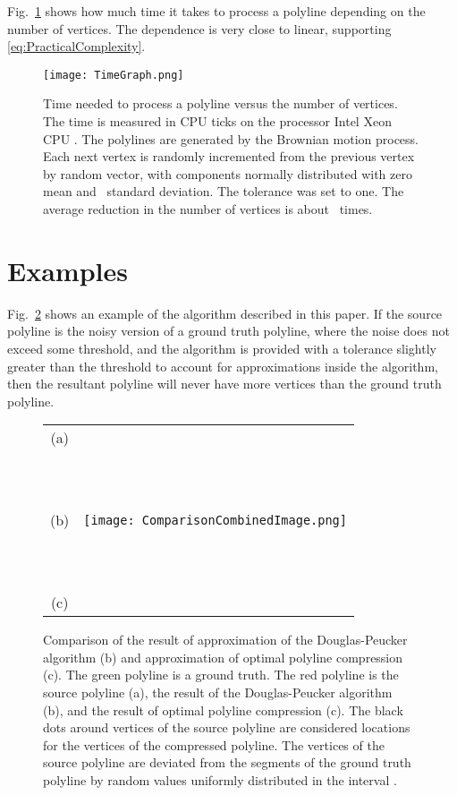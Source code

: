 \documentclass[conference]{IEEEtran}
\begin{document}
Fig.~\ref{fig:EstimationOfAlgorithmComplexity} shows how much time it takes to process a polyline depending on the number of vertices. The dependence is very close to linear, supporting \eqref{eq:PracticalComplexity}.

\begin{figure} [htb]
  \centering
  \texttt{[image: TimeGraph.png]}
  \caption
  {
    Time needed to process a polyline versus the number of vertices. The time is measured in CPU ticks on the processor Intel Xeon CPU . The polylines are generated by the Brownian motion process. Each next vertex is randomly incremented from the previous vertex by random vector, with components normally distributed with zero mean and ~standard deviation. The tolerance was set to one. The average reduction in the number of vertices is about ~times.
  }
  \label{fig:EstimationOfAlgorithmComplexity}
\end{figure}

\section{Examples}

Fig.~\ref{fig:Comparison} shows an example of the algorithm described in this paper. If the source polyline is the noisy version of a ground truth polyline, where the noise does not exceed some threshold, and the algorithm is provided with a tolerance slightly greater than the threshold to account for approximations inside the algorithm, then the resultant polyline will never have more vertices than the ground truth polyline.

\begin{figure} [htb]
  \centering
  \begin{tabular}{c c}
    \shortstack{(a) \\ \\ \\ \\ (b) \\ \\ \\ \\ (c)} & \texttt{[image: ComparisonCombinedImage.png]}
  \end{tabular}
  \caption
  {
    Comparison of the result of approximation of the Douglas-Peucker algorithm (b) and approximation of optimal polyline compression (c).
    The green polyline is a ground truth. The red polyline is the source polyline (a), the result of the Douglas-Peucker algorithm~\cite{CompressionAlgorithm} (b), and the result of optimal polyline compression (c). The black dots around vertices of the source polyline are considered locations for the vertices of the compressed polyline. The vertices of the source polyline are deviated from the segments of the ground truth polyline by random values uniformly distributed in the interval .
  }
  \label{fig:Comparison}
\end{figure}
\end{document}

